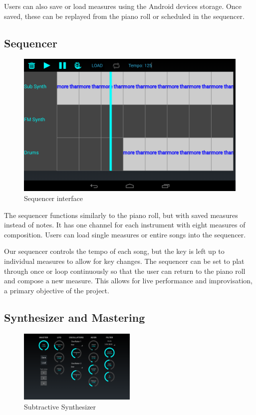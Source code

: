 \documentclass[letterpaper,12pt]{article}
\begin{document}
Users can also save or load measures using the Android devices storage. Once saved, these can be replayed from the piano roll or scheduled in the sequencer.

\subsection{Sequencer}

\begin{figure}
\centering
\includegraphics[width=.6\textwidth]{figures/sequencer.png}
\caption{Sequencer interface}
\label{fig:sequencer}
\end{figure}

The sequencer functions similarly to the piano roll, but with saved measures instead of notes. It has one channel for each instrument with eight measures of composition. Users can load single measures or entire songs into the sequencer.

Our sequencer controls the tempo of each song, but the key is left up to individual measures to allow for key changes. The sequencer can be set to plat through once or loop continuously so that the user can return to the piano roll and compose a new measure. This allows for live performance and improvisation, a primary objective of the project.

\subsection{Synthesizer and Mastering}

\begin{figure}[h]
\centering
\includegraphics[width=0.5\textwidth]{figures/subtractivesynth.png}
\caption{Subtractive Synthesizer}
\label{fig:subtractivesynth}
\end{figure}
\end{document}
